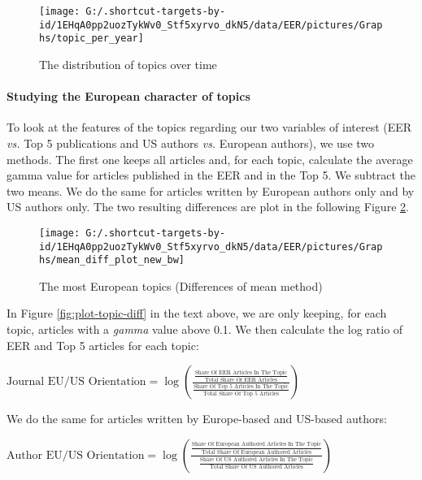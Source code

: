\documentclass[]{elsarticle} %
\begin{document}
\begin{figure}[h]

{\centering \texttt{[image: G:/.shortcut-targets-by-id/1EHqA0pp2uozTykWv0\_Stf5xyrvo\_dkN5/data/EER/pictures/Graphs/topic\_per\_year]} 

}

\caption{The distribution of topics over time}\label{fig:plot-topic-year}
\end{figure}

\hypertarget{studying-the-european-character-of-topics}{%
\paragraph*{Studying the European character of
topics}\label{studying-the-european-character-of-topics}}

To look at the features of the topics regarding our two variables of
interest (EER \emph{vs.} Top 5 publications and US authors \emph{vs.}
European authors), we use two methods. The first one keeps all articles
and, for each topic, calculate the average gamma value for articles
published in the EER and in the Top 5. We subtract the two means. We do
the same for articles written by European authors only and by US authors
only. The two resulting differences are plot in the following Figure
\ref{fig:plot-topic-diff-alternative}.

\begin{figure}[h]

{\centering \texttt{[image: G:/.shortcut-targets-by-id/1EHqA0pp2uozTykWv0\_Stf5xyrvo\_dkN5/data/EER/pictures/Graphs/mean\_diff\_plot\_new\_bw]} 

}

\caption{The most European topics (Differences of mean method)}\label{fig:plot-topic-diff-alternative}
\end{figure}

In Figure \ref{fig:plot-topic-diff} in the text above, we are only
keeping, for each topic, articles with a \emph{gamma} value above 0.1.
We then calculate the log ratio of EER and Top 5 articles for each
topic:

\bigskip

\({\scriptstyle \text{Journal EU/US Orientation}=\log(\frac{\frac{\text{Share Of EER Articles In The Topic}}{\text{Total Share Of EER Articles}}} {\frac{\text{Share Of Top 5 Articles In The Topic}}{\text{Total Share Of Top 5 Articles}}})}\)

\bigskip

We do the same for articles written by Europe-based and US-based
authors:

\bigskip

\({\scriptstyle \text{Author EU/US Orientation}=\log(\frac{\frac{\text{Share Of European Authored Articles In The Topic}}{\text{Total Share Of European Authored Articles}}} {\frac{\text{Share Of US Authored Articles In The Topic}}{\text{Total Share Of US Authored Articles}}})}\)


\end{document}
